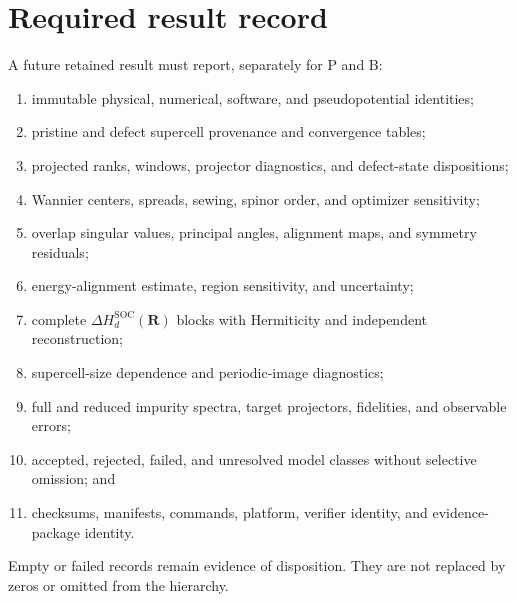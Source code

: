 \documentclass[11pt]{article}
\begin{document}
\section{Required result record}
A future retained result must report, separately for P and B:
\begin{enumerate}
 \item immutable physical, numerical, software, and pseudopotential identities;
 \item pristine and defect supercell provenance and convergence tables;
 \item projected ranks, windows, projector diagnostics, and defect-state dispositions;
 \item Wannier centers, spreads, sewing, spinor order, and optimizer sensitivity;
 \item overlap singular values, principal angles, alignment maps, and symmetry residuals;
 \item energy-alignment estimate, region sensitivity, and uncertainty;
 \item complete $\Delta H_d^{\mathrm{SOC}}(\mathbf R)$ blocks with Hermiticity and independent reconstruction;
 \item supercell-size dependence and periodic-image diagnostics;
 \item full and reduced impurity spectra, target projectors, fidelities, and observable errors;
 \item accepted, rejected, failed, and unresolved model classes without selective omission; and
 \item checksums, manifests, commands, platform, verifier identity, and evidence-package identity.
\end{enumerate}
Empty or failed records remain evidence of disposition. They are not replaced by zeros or
omitted from the hierarchy.



\end{document}
